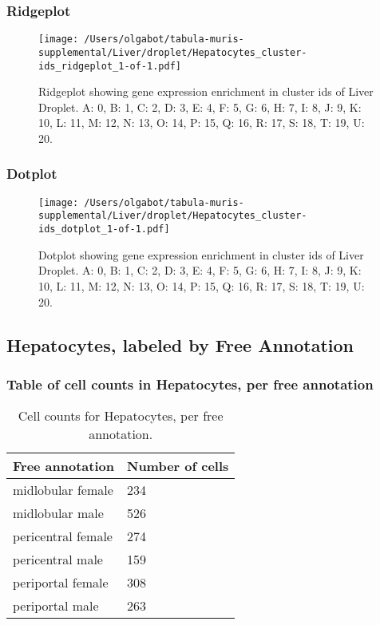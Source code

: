 \clearpage
\clearpage
\subsubsection{Ridgeplot}
\begin{figure}[h]
\centering
\texttt{[image: /Users/olgabot/tabula-muris-supplemental/Liver/droplet/Hepatocytes\_cluster-ids\_ridgeplot\_1-of-1.pdf]}

\caption{ Ridgeplot  showing gene expression enrichment in cluster ids of Liver Droplet. A: 0, B: 1, C: 2, D: 3, E: 4, F: 5, G: 6, H: 7, I: 8, J: 9, K: 10, L: 11, M: 12, N: 13, O: 14, P: 15, Q: 16, R: 17, S: 18, T: 19, U: 20.}
\end{figure}


\clearpage
\clearpage
\subsubsection{Dotplot}
\begin{figure}[h]
\centering
\texttt{[image: /Users/olgabot/tabula-muris-supplemental/Liver/droplet/Hepatocytes\_cluster-ids\_dotplot\_1-of-1.pdf]}

\caption{ Dotplot  showing gene expression enrichment in cluster ids of Liver Droplet. A: 0, B: 1, C: 2, D: 3, E: 4, F: 5, G: 6, H: 7, I: 8, J: 9, K: 10, L: 11, M: 12, N: 13, O: 14, P: 15, Q: 16, R: 17, S: 18, T: 19, U: 20.}
\end{figure}


\clearpage
\subsection{Hepatocytes, labeled by Free Annotation}
\subsubsection{Table of cell counts in Hepatocytes, per free annotation}\begin{table}[h]
\centering
\label{my-label}
\begin{tabular}{@{}ll@{}}
\toprule

Free annotation& Number of cells \\ \midrule
midlobular female & 234 \\

midlobular male & 526 \\

pericentral female & 274 \\

pericentral male & 159 \\

periportal female & 308 \\

periportal male & 263 \\
\bottomrule
\end{tabular}
\caption{Cell counts for Hepatocytes, per free annotation.}
\end{table}

